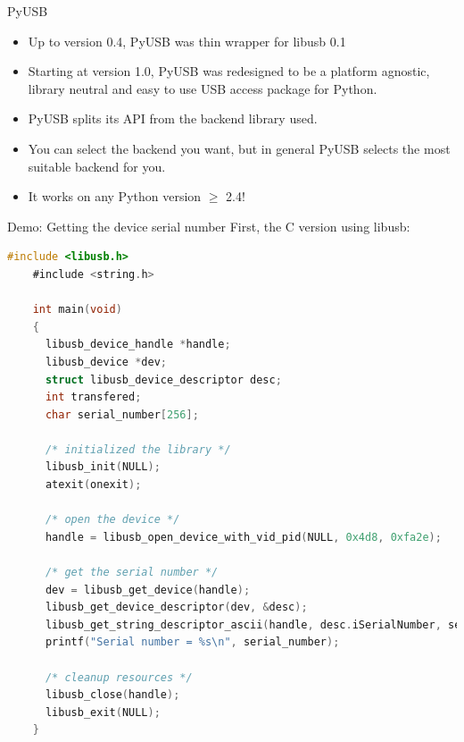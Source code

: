 \documentclass[pdf]{beamer}
\begin{document}
\begin{frame}{PyUSB}
  \begin{itemize}
    \item Up to version 0.4, PyUSB was thin wrapper for libusb 0.1
    \item Starting at version 1.0, PyUSB was redesigned to be a
      platform agnostic, library neutral and easy to use USB access
      package for Python.
    \item PyUSB splits its API from the backend library used.
    \item You can select the backend you want, but in general PyUSB
      selects the most suitable backend for you.
    \item It works on any Python version $\ge$ 2.4!
  \end{itemize}
\end{frame}

\begin{frame}[fragile]{Demo: Getting the device serial number}
  \tiny
  \pause
  First, the C version using libusb:
  \pause
  \begin{lstlisting}[language=C]
    #include <libusb.h>
    #include <string.h>

    int main(void)
    {
      libusb_device_handle *handle;
      libusb_device *dev;
      struct libusb_device_descriptor desc;
      int transfered;
      char serial_number[256];

      /* initialized the library */
      libusb_init(NULL);
      atexit(onexit);

      /* open the device */
      handle = libusb_open_device_with_vid_pid(NULL, 0x4d8, 0xfa2e);

      /* get the serial number */
      dev = libusb_get_device(handle);
      libusb_get_device_descriptor(dev, &desc);
      libusb_get_string_descriptor_ascii(handle, desc.iSerialNumber, serial_number, 256);
      printf("Serial number = %s\n", serial_number);

      /* cleanup resources */
      libusb_close(handle);
      libusb_exit(NULL);
    }
  \end{lstlisting}
\end{frame}
\end{document}
